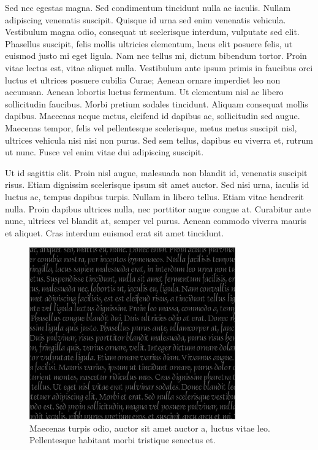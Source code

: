 Sed nec egestas magna.
Sed condimentum tincidunt nulla ac iaculis.
Nullam adipiscing venenatis suscipit.
Quisque id urna sed enim venenatis vehicula.
Vestibulum magna odio, consequat ut scelerisque interdum, vulputate sed elit.
Phasellus suscipit, felis mollis ultricies elementum, lacus elit posuere felis, ut euismod justo mi eget ligula.
Nam nec tellus mi, dictum bibendum tortor.
Proin vitae lectus est, vitae aliquet nulla.
Vestibulum ante ipsum primis in faucibus orci luctus et ultrices posuere cubilia Curae; Aenean ornare imperdiet leo non accumsan.
Aenean lobortis luctus fermentum.
Ut elementum nisl ac libero sollicitudin faucibus.
Morbi pretium sodales tincidunt.
Aliquam consequat mollis dapibus.
Maecenas neque metus, eleifend id dapibus ac, sollicitudin sed augue.
Maecenas tempor, felis vel pellentesque scelerisque, metus metus suscipit nisl, ultrices vehicula nisi nisi non purus.
Sed sem tellus, dapibus eu viverra et, rutrum ut nunc.
Fusce vel enim vitae dui adipiscing suscipit.

Ut id sagittis elit.
Proin nisl augue, malesuada non blandit id, venenatis suscipit risus.
Etiam dignissim scelerisque ipsum sit amet auctor.
Sed nisi urna, iaculis id luctus ac, tempus dapibus turpis.
Nullam in libero tellus.
Etiam vitae hendrerit nulla.
Proin dapibus ultrices nulla, nec porttitor augue congue at.
Curabitur ante nunc, ultrices vel blandit at, semper vel purus.
Aenean commodo viverra mauris et aliquet.
Cras interdum euismod erat sit amet tincidunt.

\begin{figure}[!tb]
  \centering
  \includegraphics{figs/large-rectangle-black}
  \caption[Maecenas turpis odio]{
    Maecenas turpis odio, auctor sit amet auctor a, luctus vitae leo.
Pellentesque habitant morbi tristique senectus et.
  }
\end{figure}

